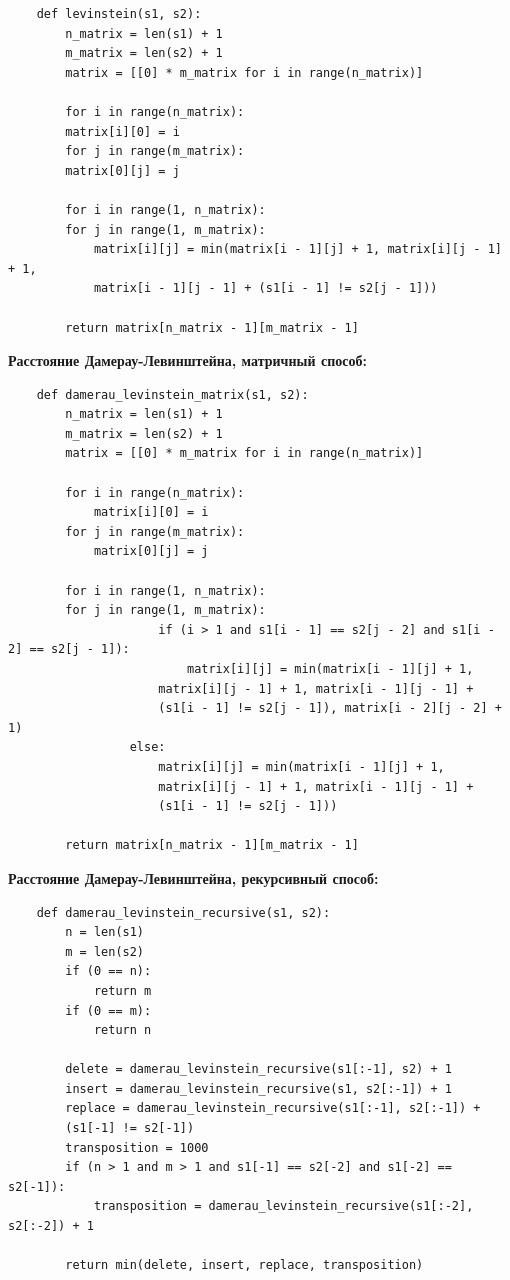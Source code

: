 \documentclass[a4paper,14pt]{article} %
\begin{document}
	\begin{lstlisting}
	def levinstein(s1, s2):
 	    n_matrix = len(s1) + 1
 	    m_matrix = len(s2) + 1
 	    matrix = [[0] * m_matrix for i in range(n_matrix)]

 	    for i in range(n_matrix):
  	 	matrix[i][0] = i
 	    for j in range(m_matrix):
 		matrix[0][j] = j

 	    for i in range(1, n_matrix):
   		for j in range(1, m_matrix):
   		    matrix[i][j] = min(matrix[i - 1][j] + 1, matrix[i][j - 1] + 1,
   	   	    matrix[i - 1][j - 1] + (s1[i - 1] != s2[j - 1]))
 
 	    return matrix[n_matrix - 1][m_matrix - 1]
	\end{lstlisting}

	\textbf{Расстояние Дамерау-Левинштейна, матричный способ: }
	\begin{lstlisting}
	def damerau_levinstein_matrix(s1, s2):
	    n_matrix = len(s1) + 1
	    m_matrix = len(s2) + 1
   	    matrix = [[0] * m_matrix for i in range(n_matrix)]

 	    for i in range(n_matrix):
  	        matrix[i][0] = i
 	    for j in range(m_matrix):
  	        matrix[0][j] = j

 	    for i in range(1, n_matrix):
   		for j in range(1, m_matrix):
    	             if (i > 1 and s1[i - 1] == s2[j - 2] and s1[i - 2] == s2[j - 1]):
     	                 matrix[i][j] = min(matrix[i - 1][j] + 1, 
	                 matrix[i][j - 1] + 1, matrix[i - 1][j - 1] + 
	                 (s1[i - 1] != s2[j - 1]), matrix[i - 2][j - 2] + 1)
   	             else:
   	                 matrix[i][j] = min(matrix[i - 1][j] + 1, 
	                 matrix[i][j - 1] + 1, matrix[i - 1][j - 1] + 
	                 (s1[i - 1] != s2[j - 1]))

 	    return matrix[n_matrix - 1][m_matrix - 1]
	\end{lstlisting}

	\textbf{Расстояние Дамерау-Левинштейна, рекурсивный способ: }
	\begin{lstlisting}
	def damerau_levinstein_recursive(s1, s2):
	    n = len(s1)
	    m = len(s2)
	    if (0 == n):
  	        return m
	    if (0 == m):
  	        return n

	    delete = damerau_levinstein_recursive(s1[:-1], s2) + 1
	    insert = damerau_levinstein_recursive(s1, s2[:-1]) + 1
	    replace = damerau_levinstein_recursive(s1[:-1], s2[:-1]) + 
	    (s1[-1] != s2[-1])
	    transposition = 1000
	    if (n > 1 and m > 1 and s1[-1] == s2[-2] and s1[-2] == s2[-1]):
  	        transposition = damerau_levinstein_recursive(s1[:-2], s2[:-2]) + 1

	    return min(delete, insert, replace, transposition)
	\end{lstlisting}
\end{document}
